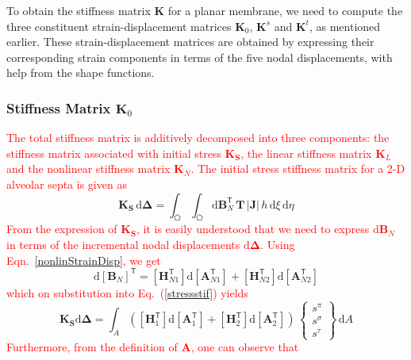 To obtain the stiffness matrix $\mathbf{K}$ for a planar membrane, we need to compute the three constituent strain-displacement matrices $\mathbf{K}_0$, $\mathbf{K}^s$ and $\mathbf{K}^t$, as mentioned earlier. These strain-displacement matrices are obtained by expressing their corresponding strain components in terms of the five nodal displacements, with help from the shape functions.

\subsubsection{Stiffness Matrix $\mathbf{K}_0$}

\textcolor{red}{The total stiffness matrix is additively decomposed into three components: the stiffness matrix associated with initial stress $\mathbf{K_S}$, the linear stiffness matrix $\mathbf{K}_L$ and the nonlinear stiffness matrix $\mathbf{K}_N$. The initial stress stiffness matrix  for a 2-D alveolar septa is given as}
\begin{equation}
\mathbf{K}_\mathbf{S}\,\mathrm{d}\boldsymbol{\Delta} = \int_{\pentagon} \int_{\pentagon}  \mathrm{d} \mathbf{B}_N^{\mathsf{T}} \, \mathbf{T} \, |\mathbf{J}|  \, h \,  \mathrm{d} \xi \,  \mathrm{d} \eta \label{stressstif}
\end{equation}
\textcolor{red}{From the expression of $\mathbf{K_{\mathbf{S}}}$, it is easily understood that we need to express $\mathrm{d}\mathbf{B}_N$ in terms of the incremental nodal displacements $\mathrm{d}\boldsymbol{\Delta}$. Using Eqn.~\eqref{nonlinStrainDisp}, we get}
\begin{equation}
\mathrm{d}[\mathbf{B}_N]^{\mathsf{T}} = [\mathbf{H}_{N1}^{\mathsf{T}}] \mathrm{d} [\mathbf{A}_{N1}^{\mathsf{T}}] + [\mathbf{H}_{N2}^{\mathsf{T}}] \mathrm{d} [\mathbf{A}_{N2}^{\mathsf{T}}] 
\end{equation}
\textcolor{red}{which on substitution into Eq.~(\ref{stressstif}) yields} 
\begin{equation}
\mathbf{K_\mathbf{S}} \mathrm{d} \boldsymbol{\Delta} = \int_A \left(
[\mathbf{H}_1^{\mathsf{T}}] \mathrm{d} [\mathbf{A}_1^{\mathsf{T}}] + [\mathbf{H}_2^{\mathsf{T}}] \mathrm{d} [\mathbf{A}_2^{\mathsf{T}}]\right) \, \begin{Bmatrix} s^{\pi} \\ s^{\sigma} \\  s^{\tau} \end{Bmatrix} \, \mathrm{d} A
\label{initstiff}
\end{equation}
\textcolor{red}{Furthermore, from the definition of $\mathbf{A}$, one can observe that}

